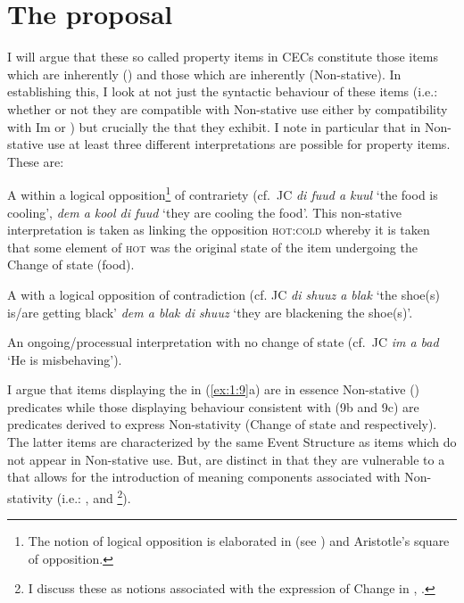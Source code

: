 \section{The proposal}\label{sec:1.7}

I will argue that these so called property items in CECs constitute
those items which are inherently  () and those which are
inherently  (Non-stative).  In establishing this, I look at
not just the syntactic behaviour of these items (i.e.: whether or not
they are compatible with Non-stative use either by compatibility with
Im or ) but crucially the
 that they exhibit.  I note in particular that in
Non-stative use at least three different interpretations are possible
for property items. These are:

\ea\label{ex:1:9}
  \ea \parbox[t]{\linewidth}{A  within a logical opposition\footnote{The
    notion of logical opposition is elaborated in  (see
  \citealt{Horn1989}) and Aristotle's square of opposition.} of contrariety
  (cf.\ JC \textit{di fuud a kuul} `the food is cooling', \textit{dem a kool di
  fuud} `they are cooling the food'.  This non-stative interpretation is taken
  as linking the opposition \textsc{hot}:\textsc{cold} whereby it is taken that some element of
  \textsc{hot} was the original state of the item undergoing the Change of state (food).}
  \ex \parbox[t]{\linewidth}{A  with a logical opposition of
  contradiction (cf. JC \textit{di shuuz a blak} `the shoe(s) is\slash are getting
  black' \textit{dem a blak di shuuz} `they are blackening the shoe(s)'.}
  \ex \parbox[t]{\linewidth}{An ongoing\slash processual interpretation with no change of state (cf.\ JC
  \textit{im a bad} `He is misbehaving').}
  \z
\z

I argue that items displaying the  in (\ref{ex:1:9}a) are in
essence Non-stative () predicates while those displaying behaviour
consistent with (9b and 9c) are  predicates derived to express
Non-stativity (Change of state and  respectively).  The latter items are
characterized by the same Event Structure as items which do not appear in
Non-stative use.  But, are distinct in that they are vulnerable to a
 that allows for the introduction of meaning components
associated with Non-stativity (i.e.: \CAUSE, \BECOME and \DO\footnote{I discuss
these as notions associated with the expression of Change in ,
.}).

